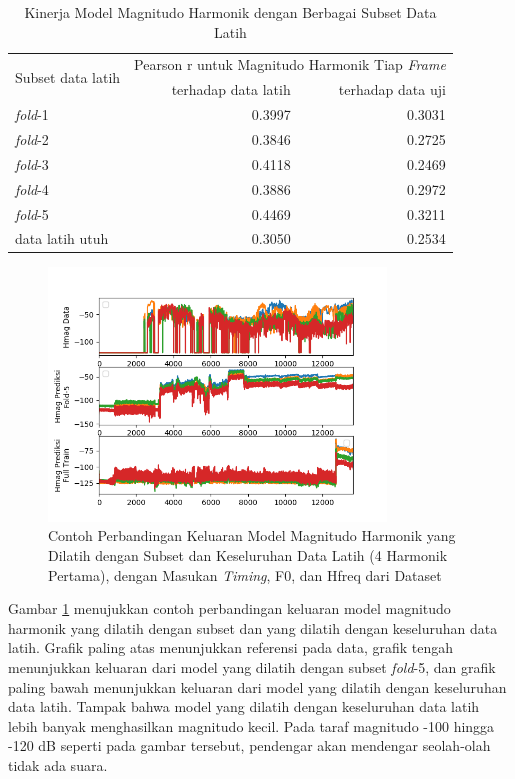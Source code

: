 \begin{table}[htbp]
    \centering
    \caption{Kinerja Model Magnitudo Harmonik dengan Berbagai Subset Data Latih}\label{tab-mag-model-subset-results}
    \begin{tabular}{ |l|r|r| } 
     \hline
     \multirow{2}{*}{Subset data latih} & \multicolumn{2}{l|}{Pearson r untuk Magnitudo Harmonik Tiap \textit{Frame}} \\
     \cline{2-3}
     & terhadap data latih & terhadap data uji \\\hline
	\textit{fold}-1      &0.3997  &0.3031\\\hline
	\textit{fold}-2      &0.3846  &0.2725\\\hline
	\textit{fold}-3      &0.4118  &0.2469\\\hline
	\textit{fold}-4      &0.3886  &0.2972\\\hline
	\textit{fold}-5      &0.4469  &0.3211\\\hline
	data latih utuh    	 &0.3050  &0.2534\\\hline
    \end{tabular}
\end{table}

\begin{figure}[htbp]
    \centering
    \includegraphics[width=0.8\textwidth]{resources/Analisis_Hmag_subset.png}
    \caption{Contoh Perbandingan Keluaran Model Magnitudo Harmonik yang Dilatih dengan Subset dan Keseluruhan Data Latih (4 Harmonik Pertama), dengan Masukan \textit{Timing}, F0, dan Hfreq dari Dataset}\label{fig-hmag-subset-output-sample}
\end{figure}

Gambar \ref{fig-hmag-subset-output-sample} menujukkan contoh perbandingan keluaran model magnitudo harmonik yang dilatih dengan subset dan yang dilatih dengan keseluruhan data latih. Grafik paling atas menunjukkan referensi pada data, grafik tengah menunjukkan keluaran dari model yang dilatih dengan subset \textit{fold}-5, dan grafik paling bawah menunjukkan keluaran dari model yang dilatih dengan keseluruhan data latih. Tampak bahwa model yang dilatih dengan keseluruhan data latih lebih banyak menghasilkan magnitudo kecil. Pada taraf magnitudo -100 hingga -120 dB seperti pada gambar tersebut, pendengar akan mendengar seolah-olah tidak ada suara.

